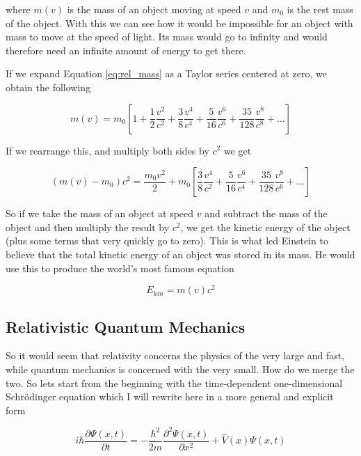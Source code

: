 where $m(v)$ is the mass of an object moving at speed $v$ and $m_{0}$ is the rest mass of the object. With this we can see how it would be impossible for an object with mass to move at the speed of light. Its mass would go to infinity and would therefore need an infinite amount of energy to get there.

If we expand Equation \ref{eq:rel_mass} as a Taylor series centered at zero, we obtain the following 

\begin{equation}
\label{eq:rel_mass_taylor}
m(v) = m_{0}\left[1 + \frac{1}{2}\frac{v^{2}}{c^{2}} + \frac{3}{8}\frac{v^{4}}{c^{4}} + \frac{5}{16}\frac{v^{6}}{c^{6}} + \frac{35}{128}\frac{v^{8}}{c^{8}} + \ldots\right]
\end{equation}

If we rearrange this, and multiply both sides by $c^{2}$ we get

\begin{equation}
\label{eq:rel_mass_taylor_rea}
(m(v) -  m_{0})c^{2}= \frac{m_{0}v^{2}}{2} + m_{0}\left[\frac{3}{8}\frac{v^{4}}{c^{2}} + \frac{5}{16}\frac{v^{6}}{c^{4}} + \frac{35}{128}\frac{v^{8}}{c^{6}} + \ldots\right]
\end{equation}

So if we take the mass of an object at speed $v$ and subtract the mass of the object and then multiply the result by $c^{2}$, we get the kinetic energy of the object (plus some terms that very quickly go to zero). This is what led Einstein to believe that the total kinetic energy of an object was stored in its mass. He would use this to produce the world's most famous equation

\begin{equation}
\label{eq:emc2}
E_{kin} = m(v)c^{2}
\end{equation}

\subsection{Relativistic Quantum Mechanics}
So it would seem that relativity concerns the physics of the very large and fast, while quantum mechanics is concerned with the very small. How do we merge the two. So lets start from the beginning with the time-dependent one-dimensional Schr\"{o}dinger equation which I will rewrite here in a more general and explicit form\cite{1926PhRv...28.1049S}

\begin{equation}
\label{eq:schr_full}
i\hbar\frac{\partial\Psi(x, t)}{\partial t} = -\frac{\hbar^{2}}{2m}\frac{\partial^{2}\Psi(x, t)}{\partial x^{2}} + \hat{V}(x)\Psi(x, t)
\end{equation}

